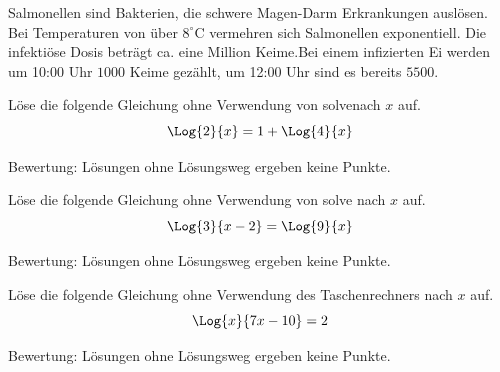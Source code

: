 \documentclass[11pt]{exam}
\begin{document}
\begin{questions}
\noaddpoints
\question[\totalpoints]
\addpoints
Salmonellen sind Bakterien, die schwere Magen-Darm Erkrankungen auslösen. Bei Temperaturen von über $8^\circ$C vermehren sich Salmonellen exponentiell. Die infektiöse Dosis beträgt ca. eine Million Keime.\newline Bei einem infizierten Ei werden um 10:00 Uhr $1000$ Keime gezählt, um 12:00 Uhr sind es bereits $5500$.

\question[4]
Löse die folgende Gleichung ohne Verwendung von \flqq solve\frqq\:nach $x$ auf. \[\Log{2}{x}=1+\Log{4}{x}\]
\begin{small}
    Bewertung: Lösungen ohne Lösungsweg ergeben keine Punkte.
\end{small}

\question[4]
Löse die folgende Gleichung ohne Verwendung von \flqq solve\frqq\: nach $x$ auf. \[\Log{3}{x-2}=\Log{9}{x}\]
\begin{small}
    Bewertung: Lösungen ohne Lösungsweg ergeben keine Punkte.
\end{small}

\question[4]
Löse die folgende Gleichung ohne Verwendung des Taschenrechners nach $x$ auf. \[\Log{x}{7x-10}=2\]
\begin{small}
    Bewertung: Lösungen ohne Lösungsweg ergeben keine Punkte.
\end{small}



\end{questions}
\end{document}
